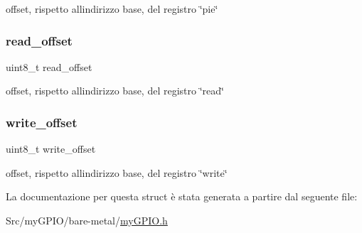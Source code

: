 offset, rispetto all\textquotesingle{}indirizzo base, del registro \char`\"{}pie\char`\"{} \mbox{\label{structmy_g_p_i_o__t_ab65acde67dc46f1d163e2ee468420b48}} 
\subsubsection{\texorpdfstring{read\+\_\+offset}{read\_offset}}
{\footnotesize\ttfamily uint8\+\_\+t read\+\_\+offset}

offset, rispetto all\textquotesingle{}indirizzo base, del registro \char`\"{}read\char`\"{} \mbox{\label{structmy_g_p_i_o__t_abb65e5db6d4ad365a7c48d00e4af1f78}} 
\subsubsection{\texorpdfstring{write\+\_\+offset}{write\_offset}}
{\footnotesize\ttfamily uint8\+\_\+t write\+\_\+offset}

offset, rispetto all\textquotesingle{}indirizzo base, del registro \char`\"{}write\char`\"{} 

La documentazione per questa struct è stata generata a partire dal seguente file\+:\begin{DoxyCompactItemize}
\item 
Src/my\+G\+P\+I\+O/bare-\/metal/\hyperlink{my_g_p_i_o_8h}{my\+G\+P\+I\+O.\+h}\end{DoxyCompactItemize}
